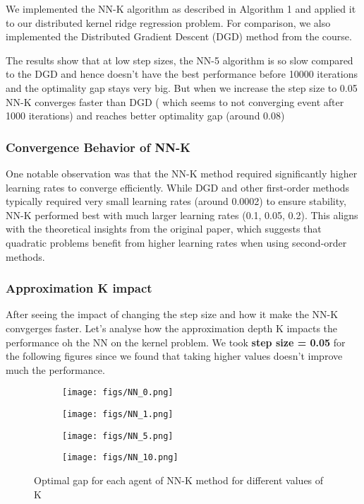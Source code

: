 \documentclass[10pt,english]{article}
\begin{document}
We implemented the NN-K algorithm as described in Algorithm 1 and applied it to our distributed kernel ridge regression problem. For comparison, we also implemented the Distributed Gradient Descent (DGD) method from the course.

The results show that at low step sizes, the NN-5 algorithm is so slow compared to the DGD and hence doesn't have the best performance before 10000 iterations and the optimality gap stays very big. But when we increase the step size to 0.05 NN-K converges faster than DGD ( which seems to not converging event after 1000 iterations) and reaches better optimality gap (around 0.08) 

\subsubsection{Convergence Behavior of NN-K}

One notable observation was that the NN-K method required significantly higher learning rates to converge efficiently. While DGD and other first-order methods typically required very small learning rates (around 0.0002) to ensure stability, NN-K performed best with much larger learning rates (0.1, 0.05, 0.2). This aligns with the theoretical insights from the original paper, which suggests that quadratic problems benefit from higher learning rates when using second-order methods.

\subsubsection{Approximation K impact}
After seeing the impact of changing the step size and how it make the NN-K convgerges faster. Let's analyse how the approximation depth K impacts the performance oh the NN on the kernel problem. We took \textbf{step size = 0.05} for the following figures since we found that taking higher values doesn't improve much the performance.

\begin{figure}[h!]
    \centering 
    \begin{subfigure}[b]{0.4\textwidth}
        \texttt{[image: figs/NN\_0.png]}
    \end{subfigure}
    \begin{subfigure}[b]{0.4\textwidth}
        \texttt{[image: figs/NN\_1.png]}
    \end{subfigure}
    \hfill  %
    \begin{subfigure}[b]{0.4\textwidth}
        \texttt{[image: figs/NN\_5.png]}
    \end{subfigure}
    \begin{subfigure}[b]{0.4\textwidth}
        \texttt{[image: figs/NN\_10.png]}
    \end{subfigure}
    \caption{Optimal gap for each agent of NN-K method for different values of K}
    \label{fig:thyroid_d3}
\end{figure}
\end{document}
